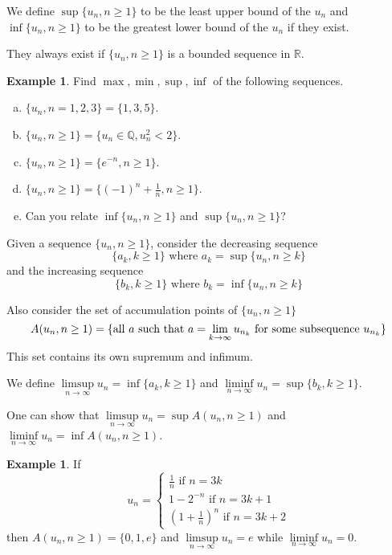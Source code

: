 \documentclass[12pt]{amsart}
\theoremstyle{definition}
\newtheorem{example}[theorem]{Example}
\begin{document}
\dfn We define $\sup \{u_n, n \geq 1\}$ to be the least upper bound of the $u_n$ and $\inf \{u_n, n \geq 1\}$ to be the greatest lower bound of the $u_n$ if they exist.

They always exist if $\{u_n, n \geq 1\}$ is a bounded sequence in $\mathbb{R}$.

\begin{example} Find $\max, \min, \sup, \inf$ of the following sequences.
\begin{enumerate}[a.]
\item $\{u_n, n = 1, 2, 3\} = \{1, 3, 5\}$.
\item $\{u_n, n \geq 1\} = \{u_n \in \mathbb{Q}, u_n^2 < 2\}$.
\item $\{u_n, n \geq 1\} = \{e^{-n}, n \geq 1\}$.
\item $\{u_n, n \geq 1\} = \{(-1)^n + \frac{1}{n}, n \geq 1\}$.
\item Can you relate $\inf \{u_n, n \geq 1\}$ and $\sup \{u_n, n \geq 1\}$?
\end{enumerate}
\end{example}

Given a sequence $\{u_n, n \geq 1\}$, consider the decreasing sequence
$$\{a_k, k \geq 1\} \text{ where } a_k = \sup \{u_n, n \geq k\}$$
and the increasing sequence
$$\{b_k, k \geq 1\} \text{ where } b_k = \inf \{u_n, n \geq k\}$$

Also consider the set of accumulation points of $\{u_n, n \geq 1\}$
$$A(u_n, n \geq 1) = \{\textnormal{all } a \textnormal{ such that } a = \lim\limits_{k \to \infty} u_{n_{k}} \textnormal{ for some subsequence } u_{n_{k}}\}$$
This set contains its own supremum and infimum.

\dfn We define $\limsup\limits_{n \to \infty} u_n = \inf \{a_k, k \geq 1\}$ and  $\liminf\limits_{n \to \infty} u_n = \sup \{b_k, k \geq 1\}$.

One can show that $\limsup\limits_{n \to \infty} u_n = \sup A(u_n, n \geq 1)$ and $\liminf\limits_{n \to \infty} u_n = \inf A(u_n, n \geq 1)$.

\begin{example} If
$$u_n = \begin{cases} \frac{1}{n} \text{ if } n = 3k \\ 1 - 2^{-n} \text{ if } n = 3k + 1 \\ (1+\frac{1}{n})^n \text{ if } n = 3k+2 \end{cases}$$
then $A(u_n, n \geq 1) = \{0, 1, e\}$ and $\limsup\limits_{n \to \infty} u_n = e$ while $\liminf\limits_{n \to \infty} u_n = 0$.
\end{example}
\end{document}
